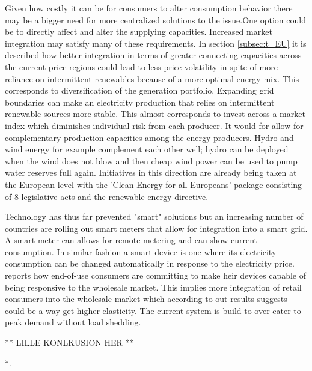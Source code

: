 Given how costly it can be for consumers to alter consumption behavior there may be a bigger need for more centralized solutions to the issue.One option could be to directly affect and alter the supplying capacities.
Increased market integration may satisfy many of these requirements. In section \ref{subsec:t_EU} it is described how better integration in terms of greater connecting capacities across the current price regions could lead to less price volatility in spite of more reliance on intermittent renewables because of a more optimal energy mix. This corresponds to diversification of the generation portfolio. Expanding grid boundaries can make an electricity production that relies on intermittent renewable sources more stable. This almost corresponds to invest across a market index which diminishes individual risk from each producer. It would for allow for complementary production capacities among the energy producers. Hydro and wind energy for example complement each other well;  hydro can be deployed when the wind does not blow and then cheap wind power can be used to pump water reserves full again. Initiatives in this direction are already being taken at the European level with the 'Clean Energy for all Europeans' package consisting of 8 legislative acts and the renewable energy directive.

Technology has thus far prevented "smart" solutions but an increasing number of countries are rolling out smart meters that allow for integration into a smart grid. A smart meter can allows for remote metering and can show current consumption. In similar fashion a smart device is one where its electricity consumption can be changed automatically in response to the electricity price.
\cite{biggar2014economics} reports how end-of-use consumers are committing to make heir devices capable of being responsive to the wholesale market. This implies more integration of retail consumers into the wholesale market which according to out results suggests could be a way get higher elasticity. The current system is build to over cater to peak demand without load shedding. 

** LILLE KONLKUSION HER **


*. %


